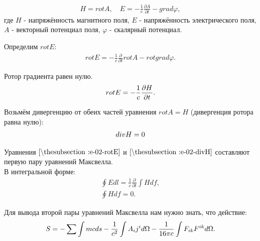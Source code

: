 \documentclass[__main__.tex]{subfiles}
\begin{document}
\begin{gather*}
	H = rot A, \quad E = -\frac{1}{c}\frac{\partial A}{\partial t} - grad \varphi,
\end{gather*}
где $H$ - напряжённость магнитного поля, $E$ - напряжённость электрического поля,
$A$ - векторный потенциал поля,
$\varphi$ - скалярный потенциал.

Определим $rot E$:
\begin{gather*}
	rot E = -\frac{1}{c}\frac{\partial}{\partial t}rot A - rot grad \varphi.
\end{gather*}

Ротор градиента равен нулю.
\begin{gather}
	\llabel{e-02-rotE}
	rot E = -\frac{1}{c}\frac{\partial H}{\partial t}.
\end{gather}

Возьмём дивергенцию от обеих частей уравнения $rot A = H$ (дивергенция ротора равна нулю):
\begin{gather}
	\llabel{e-02-divH}
	div H = 0
\end{gather}

Уравнения $\lref{e-02-rotE}$ и  $\lref{e-02-divH}$ составляют первую пару уравнений Максвелла.\\
В интегральной форме:\\
\begin{gather*}
	\oint Edl = \frac{1}{c}\frac{\partial}{\partial t}\int Hdf,\\
	\oint H df = 0.
\end{gather*}

Для вывода второй пары уравнений Максвелла нам нужно знать, что действие:
\begin{gather}
	\llabel{e-02-S}
	S = -\sum\int mcds - \frac{1}{c^2}\int A_ij^id\Omega - \frac{1}{16\pi c}\int F_{ik}F^{ik}d\Omega.
\end{gather}
\end{document}
